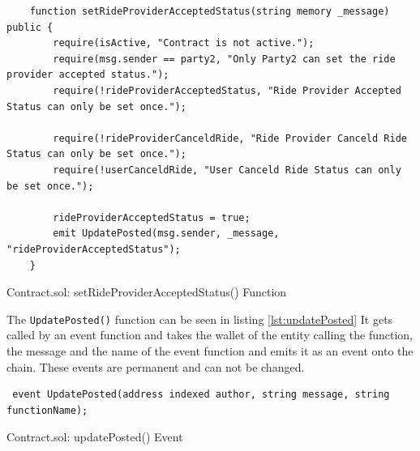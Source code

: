 \lstset{
  basicstyle=\footnotesize\ttfamily,
  breaklines=true,
  numbers=left,
  firstnumber=97
}
\begin{Listing}
\begin{lstlisting}
    function setRideProviderAcceptedStatus(string memory _message) public {
        require(isActive, "Contract is not active.");
        require(msg.sender == party2, "Only Party2 can set the ride provider accepted status.");
        require(!rideProviderAcceptedStatus, "Ride Provider Accepted Status can only be set once.");

        require(!rideProviderCanceldRide, "Ride Provider Canceld Ride Status can only be set once.");
        require(!userCanceldRide, "User Canceld Ride Status can only be set once.");

        rideProviderAcceptedStatus = true;
        emit UpdatePosted(msg.sender, _message, "rideProviderAcceptedStatus");
    }
\end{lstlisting}
  \caption{Contract.sol: setRideProviderAcceptedStatus() Function}
  \label{lst:setRideProviderAcceptedStatus}
\end{Listing}

The \texttt{UpdatePosted()} function can be seen in listing \ref{lst:updatePosted} It gets called by an event function and takes the wallet of the entity calling the function, the message and the name of the event function and emits it as an event onto the chain. These events are permanent and can not be changed.

\lstset{
  basicstyle=\footnotesize\ttfamily,
  breaklines=true,
  numbers=left,
  firstnumber=94
}

\begin{Listing}
\begin{lstlisting}
 event UpdatePosted(address indexed author, string message, string functionName);
\end{lstlisting}
  \caption{Contract.sol: updatePosted() Event}
  \label{lst:updatePosted}
\end{Listing}

